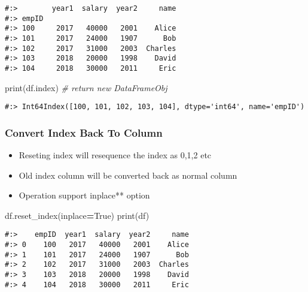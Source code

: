 \documentclass[
]{book}
\newenvironment{Shaded}{\begin{snugshade}}{\end{snugshade}}
\newcommand{\BuiltInTok}[1]{#1}
\newcommand{\CommentTok}[1]{\textcolor[rgb]{0.37,0.37,0.37}{\textit{#1}}}
\newcommand{\NormalTok}[1]{#1}
\newcommand{\OperatorTok}[1]{\textcolor[rgb]{0.43,0.43,0.43}{\textbf{#1}}}
\newcommand{\VariableTok}[1]{\textcolor[rgb]{0,0,0}{#1}}
\providecommand{\tightlist}{%
  \setlength{\itemsep}{0pt}\setlength{\parskip}{0pt}}
\begin{document}
\begin{verbatim}
#:>        year1  salary  year2     name
#:> empID                               
#:> 100     2017   40000   2001    Alice
#:> 101     2017   24000   1907      Bob
#:> 102     2017   31000   2003  Charles
#:> 103     2018   20000   1998    David
#:> 104     2018   30000   2011     Eric
\end{verbatim}

\begin{Shaded}
\begin{Highlighting}[]
\BuiltInTok{print}\NormalTok{(df.index) }\CommentTok{\# return new DataFrameObj}
\end{Highlighting}
\end{Shaded}

\begin{verbatim}
#:> Int64Index([100, 101, 102, 103, 104], dtype='int64', name='empID')
\end{verbatim}

\hypertarget{convert-index-back-to-column}{%
\subsubsection{Convert Index Back To Column}\label{convert-index-back-to-column}}

\begin{itemize}
\tightlist
\item
  Reseting index will resequence the index as 0,1,2 etc\\
\item
  Old index column will be converted back as normal column\\
\item
  Operation support inplace** option
\end{itemize}

\begin{Shaded}
\begin{Highlighting}[]
\NormalTok{df.reset\_index(inplace}\OperatorTok{=}\VariableTok{True}\NormalTok{)}
\BuiltInTok{print}\NormalTok{(df)}
\end{Highlighting}
\end{Shaded}

\begin{verbatim}
#:>    empID  year1  salary  year2     name
#:> 0    100   2017   40000   2001    Alice
#:> 1    101   2017   24000   1907      Bob
#:> 2    102   2017   31000   2003  Charles
#:> 3    103   2018   20000   1998    David
#:> 4    104   2018   30000   2011     Eric
\end{verbatim}
\end{document}
